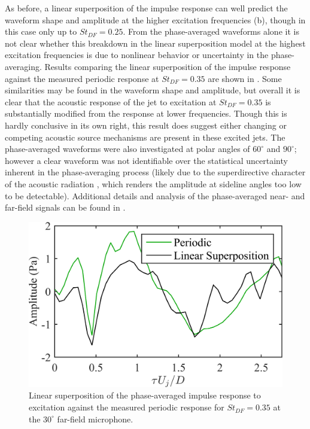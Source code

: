 As before, a linear superposition of the impulse response can well predict the waveform shape and amplitude at the higher excitation frequencies (b), though in this case only up to $St_{DF}  = 0.25$. 
From the phase-averaged waveforms alone it is not clear whether this breakdown in the linear superposition model at the highest excitation frequencies is due to nonlinear behavior or uncertainty in the phase-averaging. 
Results comparing the linear superposition of the impulse response against the measured periodic response at $St_{DF}  = 0.35$ are shown in .
Some similarities may be found in the waveform shape and amplitude, but overall it is clear that the acoustic response of the jet to excitation at $St_{DF}  = 0.35$ is substantially modified from the response at lower frequencies.
Though this is hardly conclusive in its own right, this result does suggest either changing or competing acoustic source mechanisms are present in these excited jets.
The phase-averaged waveforms were also investigated at polar angles of $60^\circ$ and $90^\circ$; however a clear waveform was not identifiable over the statistical uncertainty inherent in the phase-averaging process (likely due to the superdirective character of the acoustic radiation \citep{Crighton1990}, which renders the amplitude at sideline angles too low to be detectable).
Additional details and analysis of the phase-averaged near- and far-field signals can be found in \citet{Crawley2015}.
\begin{figure}
	\centering
	\includegraphics[width=0.45\linewidth]{Figures/ch3_farfield_linearsuperposition_st035_v2.png}
	\caption{Linear superposition of the phase-averaged impulse response to excitation against the measured periodic response for $St_{DF} = 0.35$ at the  $30^\circ$ far-field microphone.}
	\label{fig:ch3_farfield_nonlinear}
\end{figure}


